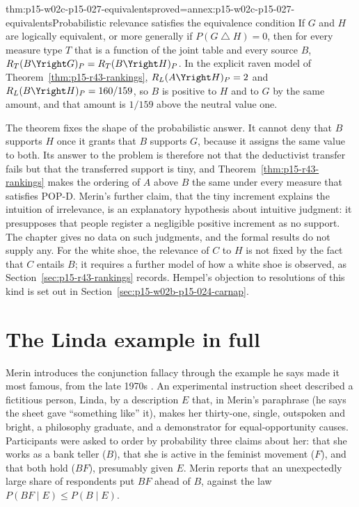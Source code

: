 \begin{hbtheorem}{thm:p15-w02c-p15-027-equivalents}{proved=annex:p15-w02c-p15-027-equivalents}{Probabilistic relevance satisfies the equivalence condition}
If \(G\) and \(H\) are logically equivalent, or more generally if
\(P(G\mathbin{\triangle}H)=0\), then for every measure type \(T\) that is
a function of the joint table and every source \(B\),
\(R_T(B\Yright G)_P=R_T(B\Yright H)_P\). In the explicit raven model of
Theorem~\ref{thm:p15-r43-rankings}, \(R_L(A\Yright H)_P=2\) and
\(R_L(B\Yright H)_P=160/159\), so \(B\) is positive to \(H\) and to
\(G\) by the same amount, and that amount is \(1/159\) above the
neutral value one.
\end{hbtheorem}

The theorem fixes the shape of the probabilistic answer. It cannot deny
that \(B\) supports \(H\) once it grants that \(B\) supports \(G\),
because it assigns the same value to both. Its answer to the problem
is therefore not that the deductivist transfer fails but that the
transferred support is tiny, and Theorem~\ref{thm:p15-r43-rankings}
makes the ordering of \(A\) above \(B\) the same under every measure
that satisfies POP-D. Merin's further claim, that the tiny increment
explains the intuition of irrelevance, is an explanatory hypothesis
about intuitive judgment: it presupposes that people register a
negligible positive increment as no support. The chapter gives no data
on such judgments, and the formal results do not supply any. For the
white shoe, the relevance of \(C\) to \(H\) is not fixed by the fact
that \(C\) entails \(B\); it requires a further model of how a white shoe
is observed, as Section~\ref{sec:p15-r43-rankings} records. Hempel's
objection to resolutions of this kind is set out in
Section~\ref{sec:p15-w02b-p15-024-carnap}.

\section{The Linda example in full}
\label{sec:p15-w02c-p15-027-linda}

Merin introduces the conjunction fallacy through the example he says
made it most famous, from the late 1970s
\cite[p.~273]{Merin2021Relevance}. An experimental instruction sheet
described a fictitious person, Linda, by a description \(E\) that, in
Merin's paraphrase (he says the sheet gave ``something like'' it), makes
her thirty-one, single, outspoken and bright, a philosophy graduate,
and a demonstrator for equal-opportunity causes. Participants were asked to
order by probability three claims about her: that she works as a bank
teller (\(B\)), that she is active in the feminist movement (\(F\)), and
that both hold (\(BF\)), presumably given \(E\). Merin reports that an
unexpectedly large share of respondents put \(BF\) ahead of \(B\),
against the law \(P(BF\mid E)\leq P(B\mid E)\).

